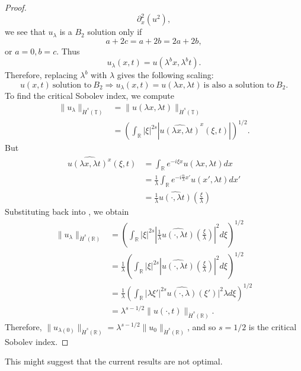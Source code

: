 \documentclass[12pt,reqno]{amsart}
\numberwithin{equation}{section}  %
\renewcommand{\cref}{\Cref}
\newcommand{\rr}{\mathbb{R}}
\newcommand{\ci}{\mathbb{T}}
\newcommand{\wh}{\widehat}
\begin{document}
\begin{appendices}
\begin{proof}
$$  \partial_x^2(u^2),  
$$
we see that $u_\lambda$ is a $B_2$ solution only if
$$
a+2c=a+2b=2a+2b,
$$
or
$
a=0, b=c.
$
  Thus
\[
u_\lambda (x, t) = u(\lambda^{b}x,  \lambda^{b} t).
\]
%
%
Therefore, replacing  $ \lambda^b$ with  $ \lambda$ gives the following scaling:
%
\begin{equation}
\label{B2-scal}
\boxed{u(x, t) \ \text{solution to} \  B_2
 \Longrightarrow 
u_\lambda (x, t) = u(\lambda x, \lambda t) \ \text{is also a
solution to} \  B_2. 
}
\end{equation}
\label{rem:scaling-B2}
To find the critical Sobolev index, we compute
%
%
\begin{equation}
\begin{split}
  \| u_{\lambda} \|_{\dot{H}^s(\ci)} 
  & =  \| u(\lambda x, \lambda t) \|_{\dot{H}^{s}(\ci)}
  \\
  & = \left( \int_{\rr} | \xi |^{2s} | \wh{u(\lambda x,
  \lambda t)}^x (\xi, t)| \right)^{1/2}.
\end{split}
\label{crit-ind-comp-B2}
\end{equation}
%
But
%
%
\begin{equation*}
\begin{split}
  \wh{u(\lambda x, \lambda t)^x}(\xi, t)
  & = \int_{\rr}e^{-i\xi x}u(\lambda x, \lambda t) dx
  \\
  & = \frac{1}{\lambda} \int_{\rr}e^{-i \frac{n}{\lambda} x'}u(x',
  \lambda t) dx'
  \\
  & = \frac{1}{\lambda} \wh{u(\cdot, \lambda t)}(\frac{\xi}{\lambda})
\end{split}
\end{equation*}
%
%
Substituting back into \cref{crit-ind-comp-B2}, we obtain
%
%
\begin{equation*}
\begin{split}
  \| u_{\lambda} \|_{\dot{H}^s(\rr)} 
  & = \left( \int_{\rr} | \xi |^{2s} |
  \frac{1}{\lambda}\wh{u(\cdot, \lambda t)}(\frac{\xi}{\lambda}) |^2 d \xi
  \right)^{1/2}
  \\
  & = \frac{1}{\lambda} \left( \int_{\rr}| \xi |^{2s} | \wh{u(\cdot,
  \lambda t)}(\frac{\xi}{\lambda}) |^2 d \xi  \right)^{1/2}
  \\
  & = \frac{1}{\lambda} \left( \int_{\rr} | \lambda \xi' |^{2s} 
  \wh{u(\cdot, \lambda)}(\xi') |^2 \lambda d \xi
  \right)^{1/2}
  \\
  & = \lambda^{s - 1/2} \|u(\cdot, t) \|_{\dot{H}^s (\rr)}.
\end{split}
\end{equation*}
%
%
Therefore, $\| u_{\lambda(0)} \|_{\dot{H}^s(\rr)} = \lambda^{s - 1/2} \|
u_{0} \|_{\dot{H}^{s}(\rr)}$, and so $s=1/2$ is the critical Sobolev index.
\end{proof}
This might suggest that the current results are not optimal.
\end{appendices}
\end{document}
